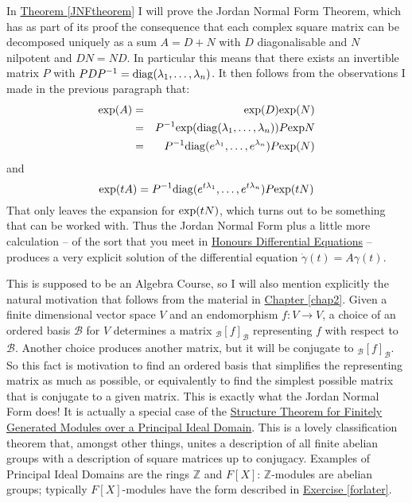 \documentclass[11pt]{amsbook}
\theoremstyle{definition}
\begin{document}
In \hyperref[JNFtheorem]{Theorem \ref{JNFtheorem}} I will prove the Jordan Normal Form Theorem, which has as part of its proof the consequence that each complex square matrix can be decomposed uniquely as a sum $A = D+N$ with $D$ diagonalisable and $N$ nilpotent and $DN = ND$. In particular this means that there exists an invertible matrix $P$ with $PDP^{-1} = {\rm diag}(\lambda_1, \ldots , \lambda_n)$. It then follows from the observations I made in the previous paragraph that: \begin{eqnarray*} {\rm exp} (A) & = & {\rm exp} (D) {\rm exp} (N) \\ & = & P^{-1} {\rm exp}({\rm diag}(\lambda_1, \ldots , \lambda_n) ) P {\rm exp}N \\ & = & P^{-1} {\rm diag}(e^{\lambda_1}, \ldots, e^{\lambda_n})P {\rm exp}(N)\end{eqnarray*} and $$ {\rm exp} (tA) = P^{-1} {\rm diag}(e^{t\lambda_1}, \ldots, e^{t\lambda_n})P {\rm exp}(tN)$$ That only leaves the expansion for ${\rm exp}(tN)$, which turns out to be something that can be worked with. Thus the Jordan Normal Form plus a little more calculation -- of the sort that you meet in \href{http://www.drps.ed.ac.uk/14-15/dpt/cxmath10066.htm}{Honours Differential Equations} -- produces a very explicit solution of the differential equation $\dot{\gamma}(t) = A \gamma(t).$
\medskip

 This is supposed to be an Algebra Course, so I will also mention explicitly the natural motivation that follows from the material in \hyperref[chap2]{Chapter \ref{chap2}}. Given a finite dimensional vector space $V$ and an endomorphism $f: V\to V$, a choice of an ordered basis $\mathcal{B}$ for $V$ determines a matrix ${}_{\mathcal{B}}[f]_{\mathcal{B}}$ representing $f$ with respect to $\mathcal{B}$. Another choice produces another matrix, but it will be conjugate to ${}_{\mathcal{B}}[f]_{\mathcal{B}}$. So this fact is motivation to find an ordered basis that simplifies the representing matrix as much as possible, or equivalently to find the simplest possible matrix that is conjugate to a given matrix. This is exactly what the Jordan Normal Form does! It is actually a special case of the \href{http://en.wikipedia.org/wiki/Structure_theorem_for_finitely_generated_modules_over_a_principal_ideal_domain}{Structure Theorem for Finitely Generated Modules over a Principal Ideal Domain}. This is a lovely classification theorem that, amongst other things, unites a description of all finite abelian groups with a description of square matrices up to conjugacy. Examples of Principal Ideal Domains are the rings $\mathbb{Z}$ and $F[X]$: $\mathbb{Z}$-modules are abelian groups; typically $F[X]$-modules have the form described in \hyperref[forlater]{Exercise \ref{forlater}}.
\end{document}
